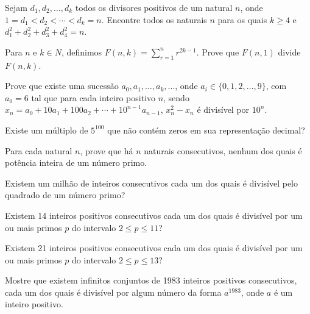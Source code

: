 \documentclass[10pt,a4paper]{article}
\begin{document}
	\begin{prob} Sejam $d_1, d_2,\ldots,d_k$ todos os divisores positivos de um
	natural $n$, onde $1=d_1<d_2<\cdots<d_k=n$. Encontre todos os naturais
	$n$ para os quais $k\geq 4$ e $d^2_1+d^2_2+d^2_3+d^2_4=n$.
	\end{prob}

	\begin{prob} Para $n$ e $k\in N$, definimos $F(n, k)=\sum\nolimits^n_{r=1}
	r^{2k-1}$. Prove que $F(n, 1)$ divide $F(n, k)$.
	\end{prob}

	\begin{prob} Prove que existe uma sucessão $a_0, a_1,\ldots,a_k,\ldots$, onde
	$a_i\in \{0, 1, 2,\ldots,9\}$, com $a_0=6$ tal que para cada inteiro
	positivo $n$, sendo $x_n=a_0+10a_1+100a_2+\cdots+10^{n-1}a_{n-1}$,
	$x^2_n-x_n$ é divisível por $10^n$.
	\end{prob}

	\begin{prob} Existe um múltiplo de $5^{100}$ que não contém zeros em sua
	representação decimal?
	\end{prob}

	\begin{prob} Para cada natural $n$, prove que há $n$ naturais consecutivos,
	nenhum dos quais é potência inteira de um número primo.
	\end{prob}

	\begin{prob} Existem um milhão de inteiros consecutivos cada um dos quais é
	divisível pelo quadrado de um número primo?
	\end{prob}

	\begin{prob} Existem 14 inteiros positivos consecutivos cada um dos quais é
	divisível por um ou mais primos $p$ do intervalo $2\leq p\leq 11$?
	\end{prob}

	\begin{prob} Existem 21 inteiros positivos consecutivos cada um dos quais é
	divisível por um ou mais primos $p$ do intervalo $2\leq p\leq 13$?
	\end{prob}

	\begin{prob} Mostre que existem infinitos conjuntos de 1983 inteiros positivos
	consecutivos, cada um dos quais é divisível por algum número da forma
	$a^{1983}$, onde $a$ é um inteiro positivo.
	\end{prob}
\end{document}

